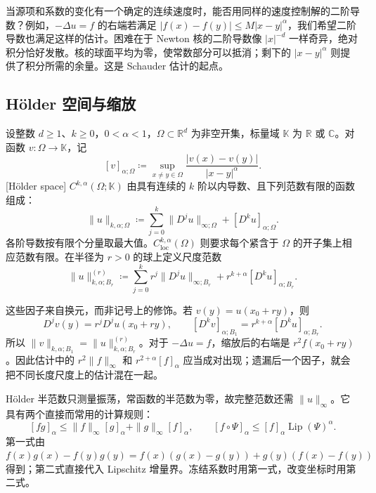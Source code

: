 
当源项和系数的变化有一个确定的连续速度时，能否用同样的速度控制解的二阶导数？例如，\(-\Delta u=f\) 的右端若满足 \(|f(x)-f(y)|\le M|x-y|^\alpha\)，我们希望二阶导数也满足这样的估计。困难在于 Newton 核的二阶导数像 \(|x|^{-d}\) 一样奇异，绝对积分恰好发散。核的球面平均为零，使常数部分可以抵消；剩下的 \(|x-y|^\alpha\) 则提供了积分所需的余量。这是 Schauder 估计的起点。

\subsection{Hölder 空间与缩放}
\label{b2:subsec:160501}

\begin{definition}
\label{b2:def:18-holder-scaled}
设整数 \(d\ge1\)、\(k\ge0\)，\(0<\alpha<1\)，\(\Omega\subset\mathbb R^d\) 为非空开集，标量域 \(\mathbb K\) 为 \(\mathbb R\) 或 \(\mathbb C\)。对函数 \(v:\Omega\to\mathbb K\)，记
\[
 [v]_{\alpha;\Omega}\coloneqq
 \sup_{x\ne y\in\Omega}\frac{|v(x)-v(y)|}{|x-y|^\alpha}.
\]
[Hölder space] \(C^{k,\alpha}(\Omega;\mathbb K)\) 由具有连续的 \(k\) 阶以内导数、且下列范数有限的函数组成：
\[
 \|u\|_{k,\alpha;\Omega}\coloneqq
 \sum_{j=0}^k\|D^ju\|_{\infty;\Omega}+[D^ku]_{\alpha;\Omega}.
\]
各阶导数按有限个分量取最大值。\(C^{k,\alpha}_{\mathrm{loc}}(\Omega)\) 则要求每个紧含于 \(\Omega\) 的开子集上相应范数有限。在半径为 \(r>0\) 的球上定义尺度范数
\[
 \|u\|_{k,\alpha;B_r}^{(r)}\coloneqq
 \sum_{j=0}^k r^j\|D^ju\|_{\infty;B_r}
 +r^{k+\alpha}[D^ku]_{\alpha;B_r}.
\]
\end{definition}

这些因子来自换元，而非记号上的修饰。若 \(v(y)=u(x_0+ry)\)，则
\[
 D^jv(y)=r^jD^ju(x_0+ry),\qquad
 [D^kv]_{\alpha;B_1}=r^{k+\alpha}[D^ku]_{\alpha;B_r}.
\]
所以 \(\|v\|_{k,\alpha;B_1}=\|u\|_{k,\alpha;B_r}^{(r)}\)。对于 \(-\Delta u=f\)，缩放后的右端是 \(r^2f(x_0+ry)\)。因此估计中的 \(r^2\|f\|_\infty\) 和 \(r^{2+\alpha}[f]_\alpha\) 应当成对出现；遗漏后一个因子，就会把不同长度尺度上的估计混在一起。

\ProseParagraphBreak
Hölder 半范数只测量振荡，常函数的半范数为零，故完整范数还需 \(\|u\|_\infty\)。它具有两个直接而常用的计算规则：
\[
 [fg]_\alpha\le\|f\|_\infty[g]_\alpha+\|g\|_\infty[f]_\alpha,
 \qquad [f\circ\Psi]_\alpha\le[f]_\alpha\operatorname{Lip}(\Psi)^\alpha.
\]
第一式由 \(f(x)g(x)-f(y)g(y)=f(x)(g(x)-g(y))+g(y)(f(x)-f(y))\) 得到；第二式直接代入 Lipschitz 增量界。冻结系数时用第一式，改变坐标时用第二式。


